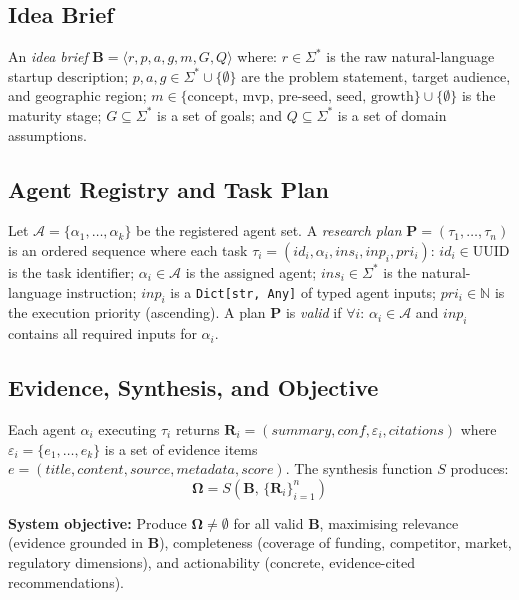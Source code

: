 \documentclass[preprint,12pt]{elsarticle}
\newcommand{\B}{\mathbf{B}}
\renewcommand{\P}{\mathbf{P}}
\newcommand{\R}{\mathbf{R}}
\newcommand{\Om}{\boldsymbol{\Omega}}
\newcommand{\calA}{\mathcal{A}}
\begin{document}
\subsection{Idea Brief}

An \emph{idea brief} $\B = \langle r, p, a, g, m, G, Q \rangle$ where:
$r \in \Sigma^*$ is the raw natural-language startup description;
$p, a, g \in \Sigma^* \cup \{\emptyset\}$ are the problem statement, target
audience, and geographic region; $m \in \{\text{concept, mvp, pre-seed, seed,
growth}\} \cup \{\emptyset\}$ is the maturity stage; $G \subseteq \Sigma^*$ is a
set of goals; and $Q \subseteq \Sigma^*$ is a set of domain assumptions.

\subsection{Agent Registry and Task Plan}

Let $\calA = \{\alpha_1, \ldots, \alpha_k\}$ be the registered agent set. A
\emph{research plan} $\P = (\tau_1, \ldots, \tau_n)$ is an ordered sequence where
each task $\tau_i = (id_i, \alpha_i, ins_i, inp_i, pri_i)$: $id_i \in
\text{UUID}$ is the task identifier; $\alpha_i \in \calA$ is the assigned agent;
$ins_i \in \Sigma^*$ is the natural-language instruction; $inp_i$ is a
\texttt{Dict[str, Any]} of typed agent inputs; $pri_i \in \mathbb{N}$ is the
execution priority (ascending). A plan $\P$ is \emph{valid} if $\forall i$:
$\alpha_i \in \calA$ and $inp_i$ contains all required inputs for $\alpha_i$.

\subsection{Evidence, Synthesis, and Objective}

Each agent $\alpha_i$ executing $\tau_i$ returns $\R_i = (summary, conf,
\varepsilon_i, citations)$ where $\varepsilon_i = \{e_1, \ldots, e_k\}$ is a set
of evidence items $e = (title, content, source, metadata, score)$. The synthesis
function $S$ produces:
\begin{equation}
  \Om = S\!\left(\B,\, \{\R_i\}_{i=1}^{n}\right)
  \label{eq:synthesis}
\end{equation}

\noindent\textbf{System objective:} Produce $\Om \ne \emptyset$ for all valid
$\B$, maximising relevance (evidence grounded in $\B$), completeness (coverage of
funding, competitor, market, regulatory dimensions), and actionability (concrete,
evidence-cited recommendations).
\end{document}
